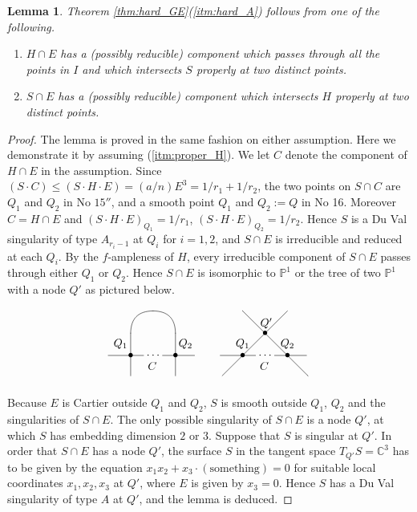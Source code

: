 \documentclass[a4paper,11pt]{amsart}
\newtheorem{lemma}[theorem]{Lemma}
\theoremstyle{definition}
\theoremstyle{remark}
\numberwithin{equation}{section}
\newcommand{\bC}{{\mathbb C}}
\newcommand{\bP}{{\mathbb P}}
\newcommand{\something}{\mathrm{something}}
\begin{document}
\begin{lemma}\label{lem:proper_intersect}
Theorem \textup{\ref{thm:hard_GE}(\ref{itm:hard_A})} follows from
one of the following.
\begin{enumerate}
\item\label{itm:proper_H}
$H \cap E$ has a \textup{(}possibly reducible\textup{)} component
which passes through all the points in $I$
and which intersects $S$ properly at two distinct points.
\item\label{itm:proper_S}
$S \cap E$ has a \textup{(}possibly reducible\textup{)} component
which intersects $H$ properly at two distinct points.
\end{enumerate}
\end{lemma}

\begin{proof}
The lemma is proved in the same fashion on either assumption.
Here we demonstrate it by assuming (\ref{itm:proper_H}).
We let $C$ denote the component of $H \cap E$ in the assumption.
Since $(S \cdot C) \le (S \cdot H \cdot E)=(a/n)E^3=1/r_1+1/r_2$,
the two points on $S \cap C$ are
$Q_1$ and $Q_2$ in No $\textrm{15}''$,
and a smooth point $Q_1$ and $Q_2:=Q$ in No 16.
Moreover $C=H \cap E$ and
$(S \cdot H \cdot E)_{Q_1}=1/r_1$, $(S \cdot H \cdot E)_{Q_2}=1/r_2$.
Hence $S$ is a Du Val singularity of type $A_{r_i-1}$ at $Q_i$ for $i=1,2$,
and $S \cap E$ is irreducible and reduced at each $Q_i$.
By the $f$-ampleness of $H$,
every irreducible component of $S \cap E$ passes through either $Q_1$ or $Q_2$.
Hence $S \cap E$ is isomorphic to $\bP^1$ or the tree of two $\bP^1$
with a node $Q'$ as pictured below.
\begin{align*}
\xymatrix@!0@=20pt{
&
&
*=0{} \ar@{-}@/_7pt/[dl] \ar@{-}@/^7pt/[dr] &
&
&
&
*=0{} \ar@{-}[dr]^>>>*-{Q'} &
&
*=0{} \ar@{-}[dl] &
\\
&
*=0{} \ar@{-}[d] &
&
*=0{} \ar@{-}[d] &
&
&
&
*=0{\bullet} \ar@{-}[dr] \ar@{-}[dl] &
&
\\
*=0{} \ar@{-}[r]^>>>>*+{Q_1} &
*=0{\bullet} \ar@{-}[r]_>*+{\quad\;\; C} \ar@{-}[d] &
*=<17pt>{\cdots} \ar@{-}[r] &
*=0{\bullet} \ar@{-}[r]^<<<<*+{Q_2} \ar@{-}[d] &
&
*=0{} \ar@{-}[r]^>*+{Q_1} &
*=0{\bullet} \ar@{-}[r]_>*+{\quad\;\; C} \ar@{-}[dl] &
*=<17pt>{\cdots} \ar@{-}[r] &
*=0{\bullet} \ar@{-}[r]^<*+{Q_2} \ar@{-}[dr] &
\\
&&&&&&&&&
}
\end{align*}

Because $E$ is Cartier outside $Q_1$ and $Q_2$,
$S$ is smooth outside $Q_1$, $Q_2$ and the singularities of $S \cap E$.
The only possible singularity of $S \cap E$ is a node $Q'$,
at which $S$ has embedding dimension $2$ or $3$.
Suppose that $S$ is singular at $Q'$.
In order that $S \cap E$ has a node $Q'$,
the surface $S$ in the tangent space $T_{Q'}S=\bC^3$
has to be given by the equation $x_1x_2+x_3\cdot(\something)=0$
for suitable local coordinates $x_1,x_2,x_3$ at $Q'$,
where $E$ is given by $x_3=0$.
Hence $S$ has a Du Val singularity of type $A$ at $Q'$,
and the lemma is deduced.
\end{proof}
\end{document}

